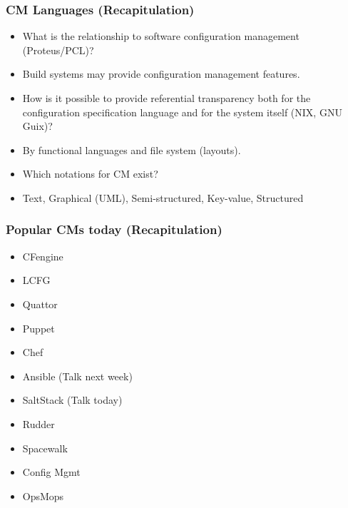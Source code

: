 \begin{frame}
	\frametitle{CM Languages (Recapitulation)}

	\begin{itemize}[<+-| alert@+>]
	\item What is the relationship to software configuration management (Proteus/PCL)?
	\item[] Build systems may provide configuration management features.
	\item How is it possible to provide referential transparency both for the configuration specification language and for the system itself (NIX, GNU Guix)?
	\item[] By functional languages and file system (layouts).
	\item Which notations for CM exist?
	\item[] Text,  Graphical (UML), Semi-structured, Key-value, Structured
	\end{itemize}
\end{frame}

\begin{frame}
	\frametitle{Popular CMs today (Recapitulation)}

	\begin{itemize} %
	\item CFengine
	\item LCFG
	\item Quattor
	\item Puppet
	\item Chef
	\item Ansible (Talk next week)
	\item SaltStack (Talk today)
	\item Rudder
	\item Spacewalk

	\item Config Mgmt
	\item OpsMops
	\end{itemize}
\end{frame}

